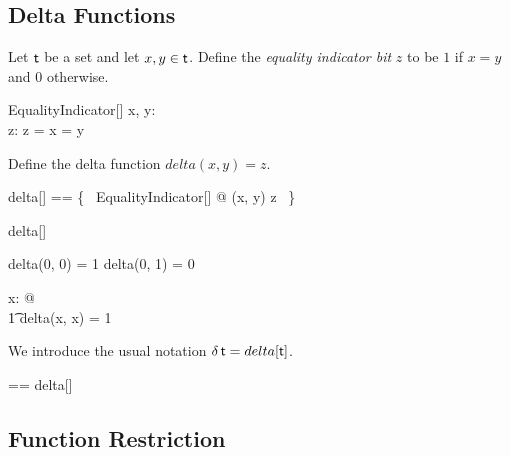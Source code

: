 \documentclass{amsart}
\begin{document}
\subsection{Delta Functions}

Let $\mathsf{t}$ be a set and let $x, y \in \mathsf{t}$. 
Define the \textit{equality indicator bit} $z$ to be $1$ if $x = y$ and $0$ otherwise.

\begin{schema}{EqualityIndicator}[\genT]
	x, y: \genT \\
	z: \B
\where
	z = \IF x = y  
\end{schema}

Define the delta function $delta(x, y) = z$.

\begin{zed}
	delta[\genT] == \{~ EqualityIndicator[\genT] @ (x, y) \mapsto z ~\}
\end{zed}

\begin{remark}
\begin{zed}
	delta[\setX] \in \setX \cross \setX \fun \B
\end{zed}
\end{remark}

\begin{example}
\begin{zed}
	delta(0, 0) = 1
\also
	delta(0, 1) = 0
\end{zed}
\end{example}

\begin{theorem}
\begin{zed}
	\forall x: \setX @ \\
	\t1	delta(x, x) = 1
\end{zed}
\end{theorem}

We introduce the usual notation $\operatorname{\delta} \mathsf{t} = delta[\mathsf{t}]$.

\begin{zed}
	\deltaF \genT == delta[\genT]
\end{zed}

\begin{example}
\end{example}

\subsection{Function Restriction}
\end{document}
